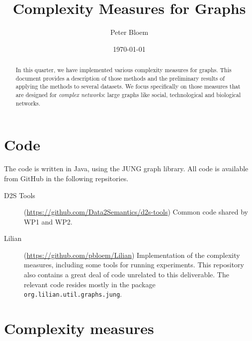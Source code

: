 \documentclass{article}
\title{Complexity Measures for Graphs}
\author{Peter Bloem}
\date{\today}
\theoremstyle{definition}
\begin{document}
\maketitle

\nocite{*}
\begin{abstract}
\noindent In this quarter, we have implemented various complexity measures for graphs. This document provides a description of those methods and the preliminary results of applying the methods to several datasets. We focus specifically on those measures that are designed for \emph{complex networks}: large graphs like social, technological and biological networks.
\end{abstract}

\section*{Code}

The code is written in Java, using the JUNG graph library. All code is available from GitHub in the following repsitories.
\begin{description}
\item[D2S Tools] (\url{https://github.com/Data2Semantics/d2s-tools}) Common code shared by WP1 and WP2.
\item[Lilian] (\url{https://github.com/pbloem/Lilian}) Implementation of the complexity measures, including some tools for running experiments. This repository also contains a great deal of code unrelated to this deliverable. The relevant code resides mostly in the package \texttt{org.lilian.util.graphs.jung}.
\end{description}

\section*{Complexity measures}
\end{document}
